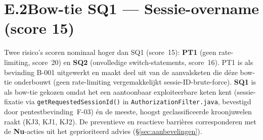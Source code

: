 \documentclass[12pt, a4paper]{report}
\newcommand{\rood}[1]{\textcolor{avansRed}{\textbf{#1}}}
\begin{document}
\newcommand{\topevent}[1]{%
    {\setlength{\fboxsep}{6pt}%
     \colorbox{avansRed}{\parbox{2.5cm}{\centering\color{white}\small
        \textbf{TOP-EVENT}\\[4pt]#1}}}}

\section*{E.2\quad Bow-tie SQ1 --- Sessie-overname (score 15)}
\label{app:bowtie-sq1}

Twee risico's scoren nominaal hoger dan SQ1 (score~15): \textbf{PT1} (geen
rate-limiting, score~20) en \textbf{SQ2} (onvolledige switch-statements, score~16).
PT1 is als bevinding B-001 uitgewerkt en maakt deel uit van de aanvalsketen die déze
bow-tie onderbouwt (geen rate-limiting vergemakkelijkt sessie-ID-brute-force).
\textbf{SQ1} is als bow-tie gekozen omdat het een aantoonbaar exploiteerbare keten kent
(sessie-fixatie via \texttt{getRequestedSessionId()} in
\texttt{AuthorizationFilter.java}, bevestigd door pentestbevinding~F-03) én de
meeste, hoogst geclassificeerde kroonjuwelen raakt (KJ3, KJ1, KJ2). De
preventieve en reactieve barrières corresponderen met de \rood{Nu}-acties uit het
geprioriteerd advies (\S\ref{sec:aanbevelingen}).
\end{document}
